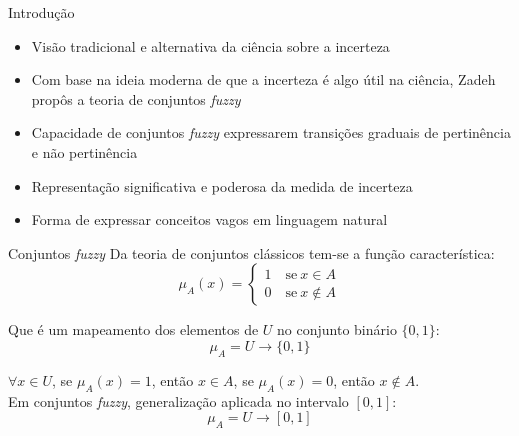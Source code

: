 \begin{frame}{Introdução}
\begin{itemize}
    \item Visão tradicional e alternativa da ciência sobre a incerteza \citep{klir:95}
    \item Com base na ideia moderna de que a incerteza é algo útil na ciência, Zadeh propôs a teoria de conjuntos \emph{fuzzy}
    \item Capacidade de conjuntos \emph{fuzzy} expressarem transições graduais de pertinência e não pertinência
    \item Representação significativa e poderosa da medida de incerteza
    \item Forma de expressar conceitos vagos em linguagem natural
\end{itemize}
\end{frame}

\begin{frame}{Conjuntos \emph{fuzzy}}
Da teoria de conjuntos clássicos tem-se a função característica:
\begin{equation*}
  \mu_A(x) =  \begin{cases}
                1 \quad \text{se}\ x \in A \\
                0 \quad \text{se}\ x \notin A
              \end{cases}
\end{equation*}

Que é um mapeamento dos elementos de $U$ no conjunto binário $\{0, 1\}$:
\begin{equation*}
  \mu_A =  U \rightarrow \{0, 1\}
\end{equation*}

$\forall x \in U$, se $\mu_A(x) = 1$, então $x \in A$, se $\mu_A(x) = 0$, então $x \notin A$.\\[8pt]

Em conjuntos \emph{fuzzy}, generalização aplicada no intervalo $[0, 1]$:
\begin{equation*}
  \mu_A =  U \rightarrow [0, 1]
\end{equation*}
\end{frame}

